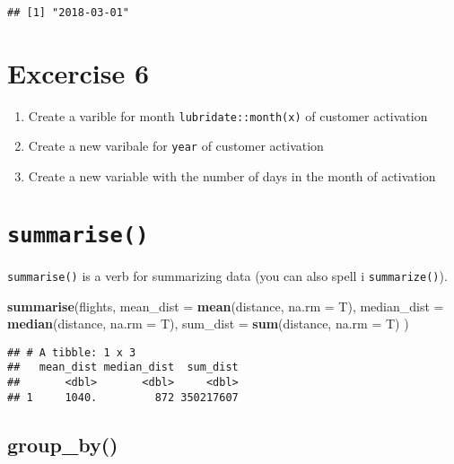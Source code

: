 \documentclass[]{book}
\newenvironment{Shaded}{\begin{snugshade}}{\end{snugshade}}
\newcommand{\DataTypeTok}[1]{\textcolor[rgb]{0.13,0.29,0.53}{#1}}
\newcommand{\KeywordTok}[1]{\textcolor[rgb]{0.13,0.29,0.53}{\textbf{#1}}}
\newcommand{\NormalTok}[1]{#1}
\providecommand{\tightlist}{%
  \setlength{\itemsep}{0pt}\setlength{\parskip}{0pt}}
\begin{document}
\begin{verbatim}
## [1] "2018-03-01"
\end{verbatim}

\hypertarget{excercise-6}{%
\section{Excercise 6}\label{excercise-6}}

\begin{enumerate}
\def\labelenumi{\arabic{enumi}.}
\tightlist
\item
  Create a varible for month \texttt{lubridate::month(x)} of customer activation
\item
  Create a new varibale for \texttt{year} of customer activation
\item
  Create a new variable with the number of days in the month of activation
\end{enumerate}

\hypertarget{summarise}{%
\section{\texorpdfstring{\texttt{summarise()}}{summarise()}}\label{summarise}}

\texttt{summarise()} is a verb for summarizing data (you can also spell i \texttt{summarize()}).

\begin{Shaded}
\begin{Highlighting}[]
\KeywordTok{summarise}\NormalTok{(flights,}
          \DataTypeTok{mean_dist =} \KeywordTok{mean}\NormalTok{(distance, }\DataTypeTok{na.rm =}\NormalTok{ T), }
          \DataTypeTok{median_dist =} \KeywordTok{median}\NormalTok{(distance, }\DataTypeTok{na.rm =}\NormalTok{ T),}
          \DataTypeTok{sum_dist =} \KeywordTok{sum}\NormalTok{(distance, }\DataTypeTok{na.rm =}\NormalTok{ T)}
\NormalTok{)}
\end{Highlighting}
\end{Shaded}

\begin{verbatim}
## # A tibble: 1 x 3
##   mean_dist median_dist  sum_dist
##       <dbl>       <dbl>     <dbl>
## 1     1040.         872 350217607
\end{verbatim}

\hypertarget{group_by}{%
\subsection{group\_by()}\label{group_by}}
\end{document}
